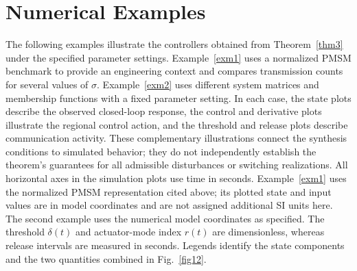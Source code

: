 \documentclass[preprint,review,fleqn,sort&compress,3p]{elsarticle}
\theoremstyle{definition} %
\theoremstyle{definition}%
\begin{document}
\section{Numerical Examples}\label{sec4}
The following examples illustrate the controllers obtained from Theorem~\ref{thm3} under the specified parameter settings. Example~\ref{exm1} uses a normalized PMSM benchmark to provide an engineering context and compares transmission counts for several values of $\sigma$. Example~\ref{exm2} uses different system matrices and membership functions with a fixed parameter setting. In each case, the state plots describe the observed closed-loop response, the control and derivative plots illustrate the regional control action, and the threshold and release plots describe communication activity. These complementary illustrations connect the synthesis conditions to simulated behavior; they do not independently establish the theorem's guarantees for all admissible disturbances or switching realizations.
All horizontal axes in the simulation plots use time in seconds. Example~\ref{exm1} uses the normalized PMSM representation cited above; its plotted state and input values are in model coordinates and are not assigned additional SI units here. The second example uses the numerical model coordinates as specified. The threshold $\delta(t)$ and actuator-mode index $r(t)$ are dimensionless, whereas release intervals are measured in seconds. Legends identify the state components and the two quantities combined in Fig.~\ref{fig12}.
\end{document}
